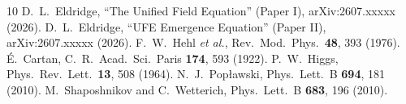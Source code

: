 \documentclass[twocolumn,prd,superscriptaddress,nofootinbib]{revtex4-2}
\begin{document}
\begin{thebibliography}{10}
 D.~L.~Eldridge, ``The Unified Field Equation'' (Paper I), arXiv:2607.xxxxx (2026).
 D.~L.~Eldridge, ``UFE Emergence Equation'' (Paper II), arXiv:2607.xxxxx (2026).
 F.~W.~Hehl \textit{et al.}, Rev.\ Mod.\ Phys.\ \textbf{48}, 393 (1976).
 \'E.~Cartan, C.~R.\ Acad.\ Sci.\ Paris \textbf{174}, 593 (1922).
 P.~W.~Higgs, Phys.\ Rev.\ Lett.\ \textbf{13}, 508 (1964).
 N.~J.~Pop{\l}awski, Phys.\ Lett.\ B \textbf{694}, 181 (2010).
 M.~Shaposhnikov and C.~Wetterich, Phys.\ Lett.\ B \textbf{683}, 196 (2010).
\end{thebibliography}
\end{document}
